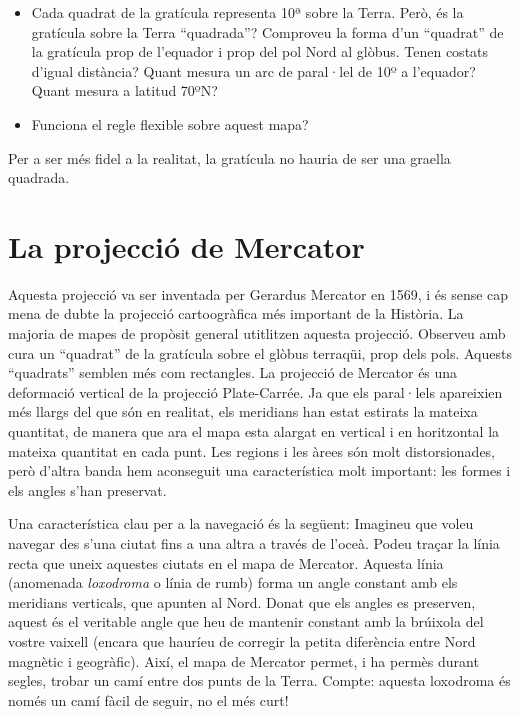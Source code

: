 \documentclass[a4paper,12pt]{article}
\begin{document}
\begin{itemize}
 \item Cada quadrat de la gratícula representa 10ª sobre la Terra. Però, és la gratícula sobre la Terra ``quadrada''? Comproveu la forma d'un ``quadrat'' de la gratícula prop de l'equador i prop del pol Nord al glòbus. Tenen costats d'igual distància? Quant mesura un arc de paral·lel de 10º a l'equador? Quant mesura a latitud 70ºN? 
 \item Funciona el regle flexible sobre aquest mapa?
\end{itemize}
Per a ser més fidel a la realitat, la gratícula no hauria de ser una graella quadrada.




 
\newpage
\section{La projecció de Mercator}
Aquesta projecció va ser inventada per Gerardus Mercator en 1569, i és sense cap mena de dubte la projecció cartoogràfica més important de la Història. La majoria de mapes de propòsit general utitlitzen aquesta projecció. Observeu amb cura un ``quadrat'' de la gratícula sobre el glòbus terraqüi, prop dels pols. Aquests ``quadrats'' semblen més com rectangles. La projecció de Mercator és una deformació vertical de la projecció Plate-Carrée. Ja que els paral·lels apareixien més llargs del que són en realitat, els meridians han estat estirats la mateixa quantitat, de manera que ara el mapa esta alargat en vertical i en horitzontal la mateixa quantitat en cada punt. Les regions i les àrees són molt distorsionades, però d'altra banda hem aconseguit una característica molt important: les formes i els angles s'han preservat.

Una característica clau per a la navegació és la següent: Imagineu que voleu navegar des s'una ciutat fins a una altra a través de l'oceà. Podeu traçar la línia recta que uneix aquestes ciutats en el mapa de Mercator. Aquesta línia (anomenada \emph{loxodroma} o línia de rumb) forma un angle constant amb els meridians verticals, que apunten al Nord. Donat que els angles es preserven, aquest és el veritable angle que heu de mantenir constant amb la brúixola del vostre vaixell (encara que hauríeu de corregir la petita diferència entre Nord magnètic i geogràfic). Així, el mapa de Mercator permet, i ha permès durant segles, trobar un camí entre dos punts de la Terra. Compte: aquesta loxodroma és només un camí fàcil de seguir, no el més curt!
\end{document}
